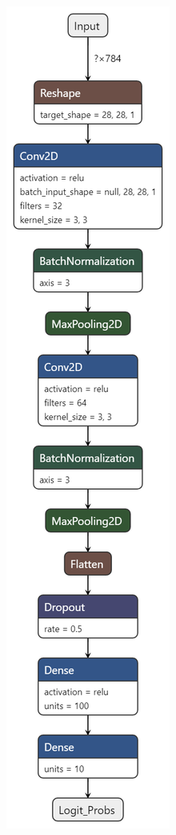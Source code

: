 \documentclass[11pt]{article}
\begin{document}
\begin{figure}[H]
\begin{subfigure}[c]{0.24\textwidth}
        \caption{}
        \label{fig:CNN3}
    \end{subfigure}
    \begin{subfigure}[c]{0.24\textwidth}
        \centering
        \includegraphics[width = \textwidth]{conv4.png}

\end{subfigure}
\end{figure}
\end{document}
